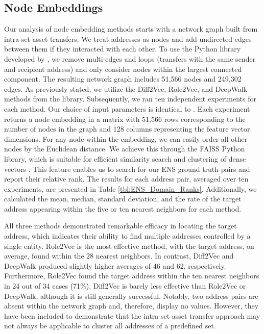 \documentclass[12pt,a4paper,titlepage,oneside,english]{article}
\begin{document}
\subsection{Node Embeddings}
Our analysis of node embedding methods starts with a network graph built from intra-set asset transfers. We treat addresses as nodes and add undirected edges between them if they interacted with each other. \newline
To use the Python library developed by \cite{karateclub}, we remove multi-edges and loops (transfers with the same sender and recipient address) and only consider nodes within the largest connected component. The resulting network graph includes 51,566 nodes and 249,302 edges. As previously stated, we utilize the Diff2Vec, Role2Vec, and DeepWalk methods from the library. \newline
Subsequently, we ran ten independent experiments for each method. Our choice of input parameters is identical to \cite{Beres2020}. Each experiment returns a node embedding in a matrix with 51,566 rows corresponding to the number of nodes in the graph and 128 columns representing the feature vector dimensions. \newline
For any node within the embedding, we can easily order all other nodes by the Euclidean distance. We achieve this through the FAISS Python library, which is suitable for efficient similarity search and clustering of dense vectors \citep{johnson2019faiss}.\newline 
This feature enables us to search for our ENS ground truth pairs and report their relative rank. The results for each address pair, averaged over ten experiments, are presented in Table \ref{tbl:ENS_Domain_Ranks}. Additionally, we calculated the mean, median, standard deviation, and the rate of the target address appearing within the five or ten nearest neighbors for each method.

All three methods demonstrated remarkable efficacy in locating the target address, which indicates their ability to find multiple addresses controlled by a single entity.
Role2Vec is the most effective method, with the target address, on average, found within the 28 nearest neighbors. In contrast, Diff2Vec and DeepWalk produced slightly higher averages of 46 and 62, respectively. Furthermore, Role2Vec found the target address within the ten nearest neighbors in 24 out of 34 cases (71\%). Diff2Vec is barely less effective than Role2Vec or DeepWalk, although it is still generally successful. \newline
Notably, two address pairs are absent within the network graph and, therefore, display no values. However, they have been included to demonstrate that the intra-set asset transfer approach may not always be applicable to cluster all addresses of a predefined set.
\end{document}

